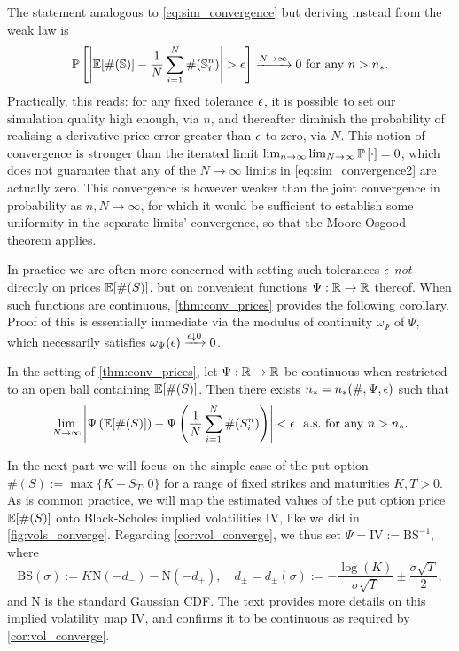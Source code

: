 The statement analogous to \autoref{eq:sim_convergence} but deriving instead from the weak law is
\begin{equation}\label{eq:sim_convergence2}
    \PP\left[\left|\EE[\#(\bS)] - \frac{1}{N}\sum_{i=1}^N \#(\bS^n_i) \right|>\ep\right] \xrightarrow{N\to\infty} 0 \text{ for any } n>n_*.
\end{equation}
Practically, this reads: for any fixed tolerance $\epsilon$, it is possible to set our simulation quality high enough, via $n$, and thereafter diminish the probability of realising a derivative price error greater than $\epsilon$ to zero, via $N$. This notion of convergence is stronger than the iterated limit
$\lim_{n\to\infty}\lim_{N\to\infty}\mathbb{P}\left[\cdot\right] = 0$,
which does not guarantee that any of the $N\to\infty$ limits in \autoref{eq:sim_convergence2} are actually zero. This convergence is however weaker than the joint convergence in probability as $n,N\to\infty$, for which it would be sufficient to establish some uniformity in the separate limits' convergence, so that the Moore-Osgood theorem applies.

In practice we are often more concerned with setting such tolerances $\epsilon$ \emph{not} directly on prices $\mathbb{E}[\#(S)]$, but on convenient functions $\Psi:\mathbb{R}\to\mathbb{R}$ thereof. When such functions are continuous, \autoref{thm:conv_prices} provides the following corollary. Proof of this is essentially immediate via the modulus of continuity $\omega_\Psi$ of $\Psi$, which necessarily satisfies $\omega_\Psi(\epsilon)\xrightarrow{\epsilon\downarrow 0}0$.

\begin{corollary}\label{cor:vol_converge}
    In the setting of \autoref{thm:conv_prices}, let $\Psi:\mathbb{R}\to\mathbb{R}$ be continuous when restricted to an open ball containing $\mathbb{E}[\#(S)]$. Then there exists $n_*=n_*(\#,\Psi,\epsilon)$ such that
        \begin{equation}\label{eq:sim_convergence3}
            \lim_{N\to\infty}\left|\Psi\left(\EE[\#(S)]\right) - \Psi\left(\frac{1}{N}\sum_{i=1}^N \#(S^n_i)\right) \right|<\ep\ \text{ a.s.~for any } n>n_*.
        \end{equation}
\end{corollary}

In the next part we will focus on the simple case of the put option $\#(S):=\max\{K-S_T,0\}$ for a range of fixed strikes and maturities $K,T>0$. As is common practice, we will map the estimated values of the put option price $\mathbb{E}[\#(S)]$ onto Black-Scholes implied volatilities $\mathrm{IV}$, like we did in \autoref{fig:vols_converge}. Regarding \autoref{cor:vol_converge}, we thus set $\Psi=\mathrm{IV}:=\mathrm{BS}^{-1}$, where
\begin{equation}\label{eq:bs_formula}
    \mathrm{BS}(\sigma) := K \mathrm{N}(-d_-) - \mathrm{N}(-d_+),\quad d_\pm = d_\pm(\sigma) := -\frac{\log(K)}{\sigma\sqrt{T}} \pm \frac{\sigma\sqrt{T}}{2},
\end{equation}
and $\mathrm{N}$ is the standard Gaussian CDF. The text \cite{gatheral_2006} provides more details on this implied volatility map IV, and confirms it to be continuous as required by \autoref{cor:vol_converge}.

